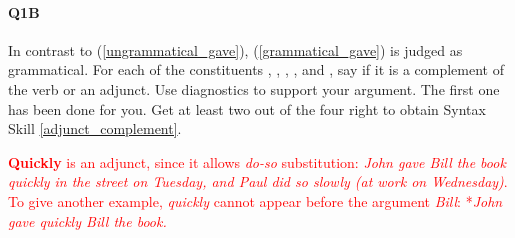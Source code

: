 \documentclass{article}
\begin{document}




\paragraph{Q1B} In contrast to (\ref{ungrammatical_gave}), (\ref{grammatical_gave}) is judged as grammatical.
For each of the constituents , , , , and , say if it is a complement of the verb or an adjunct. Use diagnostics to support your argument. The first one has been done for you. Get at least two out of the four right to obtain Syntax Skill \ref{adjunct_complement}.
\begin{exe}
    \label{grammatical_gave}
\end{exe}

\textcolor{red}{\textbf{Quickly} is an adjunct, since it allows \emph{do-so} substitution: \emph{John gave Bill the book quickly in the street on Tuesday, and Paul did so slowly (at work on Wednesday)}. To give another example, \emph{quickly} cannot appear before the argument \emph{Bill}: *\emph{John gave quickly Bill the book.}}
\end{document}

